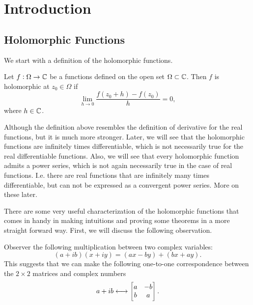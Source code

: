 \chapter{Introduction}



\section{Holomorphic Functions}
We start with a definition of the holomorphic functions.

\begin{definition}
	Let $ f: \Omega \to \mathbb{C} $ be a functions defined on the open set $ \Omega \subset \mathbb{C} $. Then $ f $ is holomorphic at $ z_0 \in \Omega $ if
	\[ \lim_{h\to 0} \frac{f(z_0 + h) - f(z_0)}{h} = 0, \]
	where $ h \in \mathbb{C} $.
\end{definition}
\begin{remark}
	Although the definition above resembles the definition of derivative for the real functions, but it is much more stronger. Later, we will see that the holomorphic functions are infinitely times differentiable, which is not necessarily true for the real differentiable functions. Also, we will see that every holomorphic function admits a power series, which is not again necessarily true in the case of real functions. I.e. there are real functions that are infinitely many times differentiable, but can not be expressed as a convergent power series. More on these later.
\end{remark}


There are some very useful characterization of the holomorphic functions that comes in handy in making intuitions and proving some theorems in a more straight forward way. First, we will discuss the following observation.

\begin{observation}
	Observer the following multiplication between two complex variables:
	\[ (a+ib) (x+iy) = (ax - by) + (bx+ay). \]
	This suggests that we can make the following one-to-one correspondence between the $ 2\times 2 $ matrices and complex numbers
	\[ a+ib \longleftrightarrow \begin{bmatrix} a & -b \\ b & a \end{bmatrix}. \]
\end{observation}

